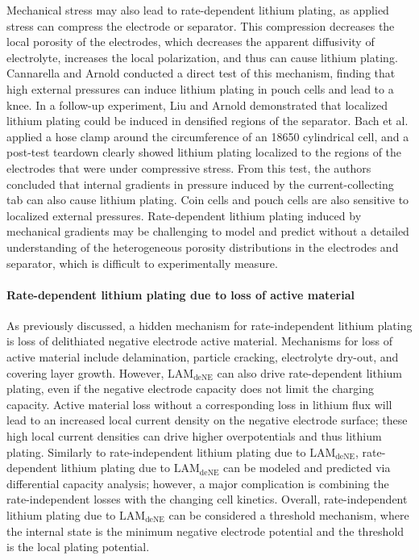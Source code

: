 \documentclass[journal=jpclcd,manuscript=article]{achemso}
\begin{document}
Mechanical stress may also lead to rate-dependent lithium plating, as applied stress can compress the electrode or separator. This compression decreases the local porosity of the electrodes, which decreases the apparent diffusivity of electrolyte, increases the local polarization, and thus can cause lithium plating. Cannarella and Arnold\cite{cannarella_stress_2014} conducted a direct test of this mechanism, finding that high external pressures can induce lithium plating in pouch cells and lead to a knee. In a follow-up experiment, Liu and Arnold\cite{liu_effects_2020} demonstrated that localized lithium plating could be induced in densified regions of the separator. Bach et al.\cite{bach_nonlinear_2016} applied a hose clamp around the circumference of an 18650 cylindrical cell, and a post-test teardown clearly showed lithium plating localized to the regions of the electrodes that were under compressive stress. From this test, the authors concluded that internal gradients in pressure induced by the current-collecting tab can also cause lithium plating. Coin cells and pouch cells are also sensitive to localized external pressures.\cite{liu_size_2018, fuchs_post-mortem_2019, okasinski_situ_2020}
Rate-dependent lithium plating induced by mechanical gradients may be challenging to model and predict without a detailed understanding of the heterogeneous porosity distributions in the electrodes and separator, which is difficult to experimentally measure.

\paragraph{Rate-dependent lithium plating due to loss of active material}
As previously discussed, a hidden mechanism for rate-independent lithium plating is loss of delithiated negative electrode active material.\cite{ansean_operando_2017, dubarry_durability_2018, baure_synthetic_2019, dubarry_big_2020} Mechanisms for loss of active material include delamination, particle cracking, electrolyte dry-out, and covering layer growth. However, $\mathrm{LAM_{deNE}}$ can also drive rate-dependent lithium plating, even if the negative electrode capacity does not limit the charging capacity. Active material loss without a corresponding loss in lithium flux will lead to an increased local current density on the negative electrode surface; these high local current densities can drive higher overpotentials and thus lithium plating.
Similarly to rate-independent lithium plating due to $\mathrm{LAM_{deNE}}$, rate-dependent lithium plating due to $\mathrm{LAM_{deNE}}$ can be modeled and predicted via differential capacity analysis; however, a major complication is combining the rate-independent losses with the changing cell kinetics.
Overall, rate-independent lithium plating due to $\mathrm{LAM_{deNE}}$ can be considered a threshold mechanism, where the internal state is the minimum negative electrode potential and the threshold is the local plating potential.
\end{document}
